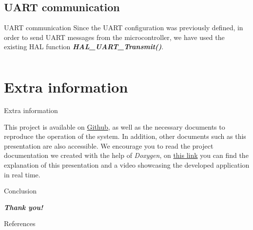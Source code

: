 \documentclass[aspectratio=169]{beamer}
\newcommand{\inputCcode}[2][c]{\inputminted[frame=lines,
                                           framesep=2mm,
                                           baselinestretch=1.2,
                                           bgcolor=black!5,
                                           linenos,
                                           fontsize=\scriptsize,
                                           obeytabs=true,
                                           tabsize=4
                                           ]{#1}{#2}}
\begin{document}
\subsection{UART communication}
\begin{frame}[fragile]{UART communication}
    Since the UART configuration was previously defined, in order to send UART messages from the microcontroller, we have used the existing HAL function \textbf{\textit{HAL\_UART\_Transmit()}}. 
    \inputCcode{Code/uart.c}
\end{frame}

\section{Extra information}
\begin{frame}{Extra information}

    This project is available on \href{https://github.com/anacalo24/MicroProject}{Github}, as well as the necessary documents to reproduce the operation of the system. In addition, other documents such as this presentation are also accessible. We encourage you to read the project documentation we created with the help of \textit{Doxygen}, on \href{https://youtu.be/KtsXlKJ0ibM}{this link} you can find the explanation of this presentation and a video showcasing the developed application in real time.

    
\end{frame}


\begin{frame}[fragile]{Conclusion}
    \begin{center}
    \textit{\textbf{\LARGE Thank you!}}
    \end{center}
\end{frame}



\begin{frame}{References}
    \printbibliography[heading=none]
\end{frame}
\end{document}
